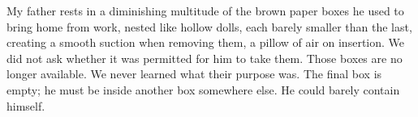 
My father rests in a diminishing multitude of the brown paper boxes he
used to bring home from work, nested like hollow dolls, each barely
smaller than the last, creating a smooth suction when removing them, a
pillow of air on insertion. We did not ask whether it was permitted for
him to take them. Those boxes are no longer available. We never learned
what their purpose was. The final box is empty; he must be inside
another box somewhere else. He could barely contain himself.

